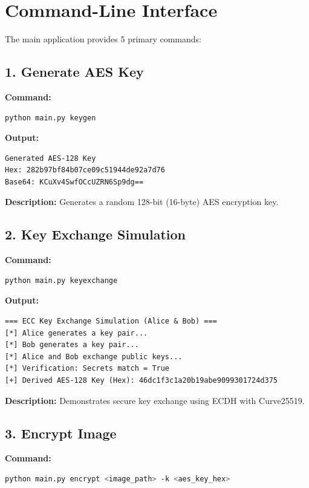 \documentclass[12pt,a4paper]{report}
\begin{document}
\section{Command-Line Interface}

The main application provides 5 primary commands:

\subsection{1. Generate AES Key}

\textbf{Command:}
\begin{lstlisting}[language=bash]
python main.py keygen
\end{lstlisting}

\textbf{Output:}
\begin{lstlisting}
Generated AES-128 Key
Hex: 282b97bf84b07ce09c51944de92a7d76
Base64: KCuXv4SwfOCcUZRN6Sp9dg==
\end{lstlisting}

\textbf{Description:} Generates a random 128-bit (16-byte) AES encryption key.

\subsection{2. Key Exchange Simulation}

\textbf{Command:}
\begin{lstlisting}[language=bash]
python main.py keyexchange
\end{lstlisting}

\textbf{Output:}
\begin{lstlisting}
=== ECC Key Exchange Simulation (Alice & Bob) ===
[*] Alice generates a key pair...
[*] Bob generates a key pair...
[*] Alice and Bob exchange public keys...
[*] Verification: Secrets match = True
[+] Derived AES-128 Key (Hex): 46dc1f3c1a20b19abe9099301724d375
\end{lstlisting}

\textbf{Description:} Demonstrates secure key exchange using ECDH with Curve25519.

\subsection{3. Encrypt Image}

\textbf{Command:}
\begin{lstlisting}[language=bash]
python main.py encrypt <image_path> -k <aes_key_hex>
\end{lstlisting}
\end{document}
